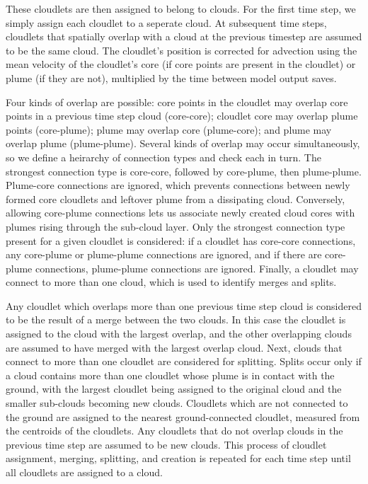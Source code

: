 \documentclass[acp]{copernicus}
\begin{document}
These cloudlets are then assigned to belong to clouds.  For the first time step,
we simply assign each cloudlet to a seperate cloud.  At subsequent time steps,
cloudlets that spatially overlap with a cloud at the previous timestep are
assumed to be the same cloud.  The cloudlet's position is corrected for
advection using the mean velocity of the cloudlet's core (if core points are
present in the cloudlet) or plume (if they are not), multiplied by the time
between model output saves.

Four kinds of overlap are possible: core points in the cloudlet may overlap 
core points in a previous time step cloud (core-core); cloudlet core may 
overlap plume points (core-plume); plume may overlap core (plume-core); and 
plume may overlap plume (plume-plume).  Several kinds of overlap may occur 
simultaneously, so we define a heirarchy of connection types and check each 
in turn.  The strongest connection type is core-core, followed by core-plume,
then plume-plume.  Plume-core connections are ignored, which prevents 
connections between newly formed core cloudlets and leftover plume from 
a dissipating cloud.  Conversely, allowing core-plume connections lets us 
associate newly created cloud cores with plumes rising through the sub-cloud 
layer.  Only the strongest connection type present for a given cloudlet is 
considered: if a cloudlet has core-core connections, any core-plume or 
plume-plume connections are ignored, and if there are core-plume connections,
plume-plume connections are ignored.  Finally, a cloudlet may connect to more
than one cloud, which is used to identify merges and splits.

Any cloudlet which overlaps more than one previous time step cloud is 
considered to be the result of a merge between the two clouds.  In this case 
the cloudlet is assigned to the cloud with the largest overlap, and the 
other overlapping clouds are assumed to have merged with the largest overlap
cloud.  Next, clouds that connect to more than one cloudlet are considered for
splitting.  Splits occur only if a cloud contains more than one cloudlet whose
plume is in contact with the ground, with the largest cloudlet being assigned 
to the original cloud and the smaller sub-clouds becoming new clouds. 
Cloudlets which are not connected to the ground are assigned to the nearest
ground-connected cloudlet, measured from the centroids of the cloudlets.  
Any cloudlets that do not overlap clouds in the previous time step are assumed
to be new clouds.  This process of cloudlet assignment, merging, splitting, and 
creation is repeated for each time step until all cloudlets are assigned to a
cloud.
  
\end{document}
